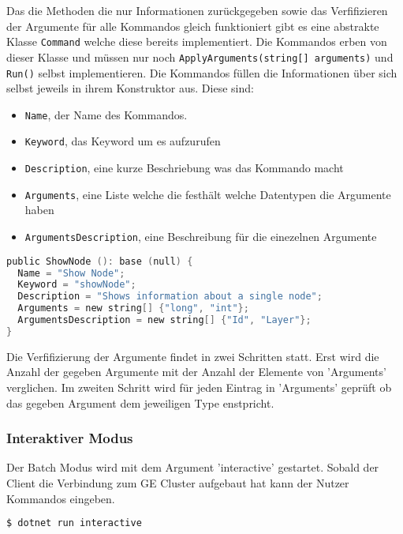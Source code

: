 Das die Methoden die nur Informationen zurückgegeben sowie das Verfifizieren der Argumente für alle Kommandos gleich funktioniert gibt es eine abstrakte Klasse
\verb|Command| welche diese bereits implementiert. Die Kommandos erben von dieser Klasse und müssen nur noch \verb|ApplyArguments(string[] arguments)| und \verb|Run()| selbst implementieren.
Die Kommandos füllen die Informationen über sich selbst jeweils in ihrem Konstruktor aus. Diese sind:

\begin{itemize}
  \item \verb|Name|, der Name des Kommandos.
  \item \verb|Keyword|, das Keyword um es aufzurufen
  \item \verb|Description|, eine kurze Beschriebung was das Kommando macht
  \item \verb|Arguments|, eine Liste welche die festhält welche Datentypen die Argumente haben
  \item \verb|ArgumentsDescription|, eine Beschreibung für die einezelnen Argumente
\end{itemize}

\begin{lstlisting}[language=c]
public ShowNode (): base (null) {
  Name = "Show Node";
  Keyword = "showNode";
  Description = "Shows information about a single node";
  Arguments = new string[] {"long", "int"};
  ArgumentsDescription = new string[] {"Id", "Layer"};
}
\end{lstlisting}


Die Verfifizierung der Argumente findet in zwei Schritten statt. Erst wird die Anzahl der gegeben Argumente mit der Anzahl der Elemente von 'Arguments' verglichen.
Im zweiten Schritt wird für jeden Eintrag in 'Arguments' geprüft ob das gegeben Argument dem jeweiligen Type enstpricht.





\subsubsection{Interaktiver Modus}

Der Batch Modus wird mit dem Argument 'interactive' gestartet. Sobald der Client die Verbindung zum GE Cluster aufgebaut hat kann der Nutzer Kommandos eingeben.


\begin{lstlisting}[language=bash]
  $ dotnet run interactive
\end{lstlisting}



